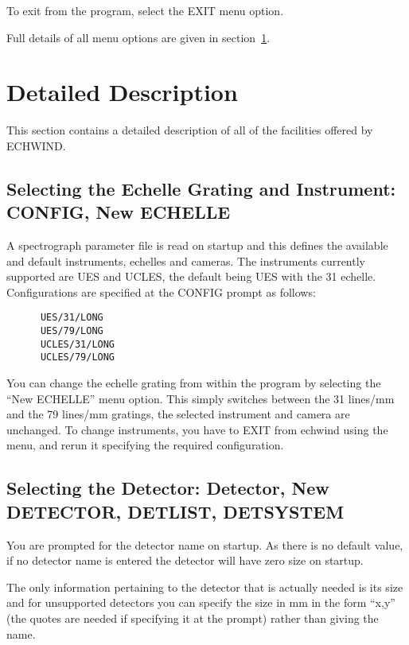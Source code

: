\documentclass[11pt]{article}
\begin{document}
To exit from the program, select the EXIT menu option.

Full details of all menu options are given in 
section~\ref{Detailed Description}.

\section{Detailed Description}
\label{Detailed Description}

This section contains a detailed description of all of the facilities offered
by ECHWIND. 

\subsection{Selecting the Echelle Grating and Instrument: CONFIG, New ECHELLE}

A spectrograph parameter file is read on startup and this
defines the available and default instruments, echelles and cameras.
The instruments currently supported are UES and UCLES, the default being
UES with the 31 echelle. Configurations are specified at the CONFIG prompt
as follows:

\begin{verbatim}
      UES/31/LONG
      UES/79/LONG
      UCLES/31/LONG
      UCLES/79/LONG
\end{verbatim}

You can change the echelle grating from within the program by selecting the
``New ECHELLE'' menu option. This simply switches between the 31 lines/mm and
the 79 lines/mm gratings, the selected instrument and camera are unchanged.
To change instruments, you have to EXIT from echwind using the menu, and
rerun it specifying the required configuration.

\subsection{Selecting the Detector: Detector, New DETECTOR, DETLIST, DETSYSTEM}

You are prompted for the detector name on startup. As there is no default
value, if no detector name is entered the detector will have zero size on
startup.

The only information pertaining to the detector that is actually needed is its
size and for unsupported detectors you can specify the size in mm in the form
``x,y'' (the quotes are needed if specifying it at the prompt) rather
than giving the name.
\end{document}
